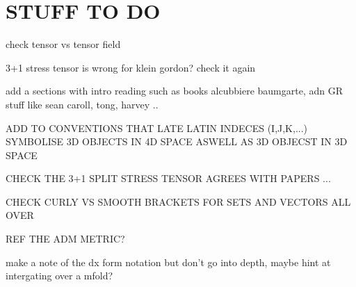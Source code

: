 \documentclass[11pt]{report}  %
\numberwithin{equation}{section}
\begin{document}








%  






% 



%  



% 

\chapter{STUFF TO DO}


check tensor vs tensor field

3+1 stress tensor is wrong for klein gordon? check it again

add a sections with intro reading such as books alcubbiere baumgarte, adn GR stuff like sean caroll, tong, harvey ..

ADD TO CONVENTIONS THAT LATE LATIN INDECES (I,J,K,...) SYMBOLISE 3D OBJECTS IN 4D SPACE ASWELL AS 3D OBJECST IN 3D SPACE

CHECK THE 3+1 SPLIT STRESS TENSOR AGREES WITH PAPERS ...

CHECK CURLY VS SMOOTH BRACKETS FOR SETS AND VECTORS ALL OVER

REF THE ADM METRIC?

make a note of the dx form notation but don't go into depth, maybe hint at intergating over a mfold?
\end{document}
